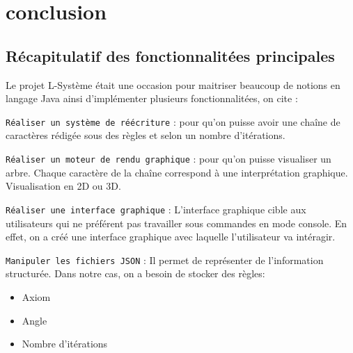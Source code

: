 \section{conclusion}
    \subsection{Récapitulatif des fonctionnalitées principales}
    \begin{onehalfspace}
    \Large{Le projet L-Système était une occasion pour maitriser beaucoup de notions
    en langage Java ainsi d'implémenter plusieurs fonctionnalitées, on cite :}
    
    \vspace{0.5cm}
    \Large{\texttt{Réaliser un système de réécriture} : pour qu'on puisse
    avoir une chaîne de caractères rédigée sous des règles et selon un nombre
    d'itérations.}
    
    \vspace{0.5cm}
    \Large{\texttt{Réaliser un moteur de rendu graphique} : pour qu'on puisse
    visualiser un arbre. Chaque caractère de la chaîne correspond à une interprétation graphique. Visualisation en 2D ou 3D.}
    
    \vspace{0.5cm}
    \Large{\texttt{Réaliser une interface graphique} : L'interface graphique cible aux utilisateurs qui ne préférent pas travailler sous commandes en mode console. En effet, on a créé une interface graphique avec laquelle l'utilisateur va intéragir.}
    
    \vspace{0.5cm}
      \Large{\texttt{Manipuler les fichiers JSON} : Il permet de représenter de l’information structurée. Dans notre cas, on a besoin de stocker des règles:}
      \begin{itemize}
          \item Axiom 
          \item Angle
          \item Nombre d'itérations
      \end{itemize}
    \end{onehalfspace}

